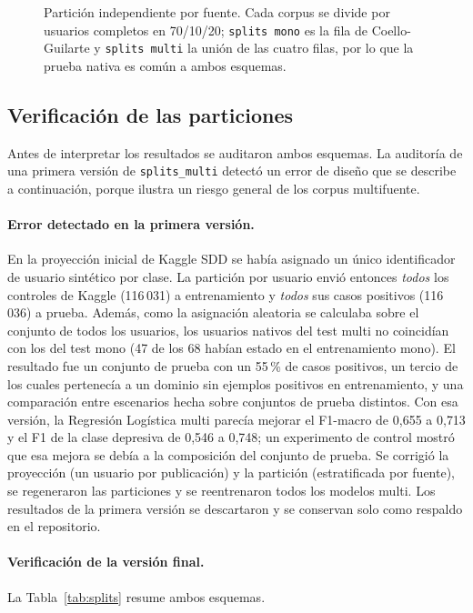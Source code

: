 \documentclass[12pt,a4paper]{article}
\begin{document}
\begin{figure}[H]
\centering
\resizebox{0.97\textwidth}{!}{}
\caption{Partición independiente por fuente. Cada corpus se divide por usuarios completos en 70/10/20; \texttt{splits mono} es la fila de Coello-Guilarte y \texttt{splits multi} la unión de las cuatro filas, por lo que la prueba nativa es común a ambos esquemas.}
\label{fig:particion}
\end{figure}

\subsection{Verificación de las particiones}
\label{sec:verificacion}
Antes de interpretar los resultados se auditaron ambos esquemas. La auditoría de una primera versión de \texttt{splits\_multi} detectó un error de diseño que se describe a continuación, porque ilustra un riesgo general de los corpus multifuente.

\paragraph{Error detectado en la primera versión.} En la proyección inicial de Kaggle SDD se había asignado un único identificador de usuario sintético por clase. La partición por usuario envió entonces \emph{todos} los controles de Kaggle (116\,031) a entrenamiento y \emph{todos} sus casos positivos (116\,036) a prueba. Además, como la asignación aleatoria se calculaba sobre el conjunto de todos los usuarios, los usuarios nativos del test multi no coincidían con los del test mono (47 de los 68 habían estado en el entrenamiento mono). El resultado fue un conjunto de prueba con un 55\,\% de casos positivos, un tercio de los cuales pertenecía a un dominio sin ejemplos positivos en entrenamiento, y una comparación entre escenarios hecha sobre conjuntos de prueba distintos. Con esa versión, la Regresión Logística multi parecía mejorar el F1-macro de 0{,}655 a 0{,}713 y el F1 de la clase depresiva de 0{,}546 a 0{,}748; un experimento de control mostró que esa mejora se debía a la composición del conjunto de prueba. Se corrigió la proyección (un usuario por publicación) y la partición (estratificada por fuente), se regeneraron las particiones y se reentrenaron todos los modelos multi. Los resultados de la primera versión se descartaron y se conservan solo como respaldo en el repositorio.

\paragraph{Verificación de la versión final.} La Tabla~\ref{tab:splits} resume ambos esquemas.
\end{document}
